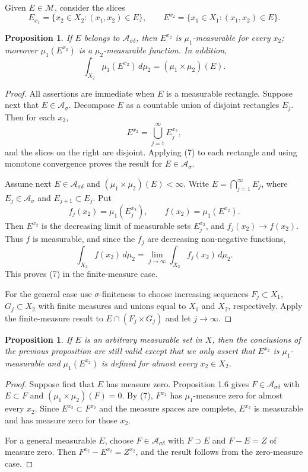 \documentclass[11pt,openany]{book}
\newtheorem{proposition}[theorem]{Proposition}
\begin{document}
Given $E\in\mathcal M$, consider the slices
\[
E_{x_1}=\{x_2\in X_2:(x_1,x_2)\in E\},
\qquad
E^{x_2}=\{x_1\in X_1:(x_1,x_2)\in E\}.
\]

\begin{proposition}
If $E$ belongs to $\mathcal A_{\sigma\delta}$, then $E^{x_2}$ is $\mu_1$-measurable for every $x_2$; moreover $\mu_1(E^{x_2})$ is a $\mu_2$-measurable function. In addition,
\begin{equation}
\int_{X_2}\mu_1(E^{x_2})\,d\mu_2=(\mu_1\times\mu_2)(E).
\tag{7}
\end{equation}
\end{proposition}

\begin{proof}
All assertions are immediate when $E$ is a measurable rectangle. Suppose next that $E\in\mathcal A_\sigma$. Decompose $E$ as a countable union of disjoint rectangles $E_j$. Then for each $x_2$,
\[
E^{x_2}=\bigcup_{j=1}^{\infty}E_j^{x_2},
\]
and the slices on the right are disjoint. Applying (7) to each rectangle and using monotone convergence proves the result for $E\in\mathcal A_\sigma$.

Assume next $E\in\mathcal A_{\sigma\delta}$ and $(\mu_1\times\mu_2)(E)<\infty$. Write $E=\bigcap_{j=1}^{\infty}E_j$, where $E_j\in\mathcal A_\sigma$ and $E_{j+1}\subset E_j$. Put
\[
f_j(x_2)=\mu_1(E_j^{x_2}),
\qquad
f(x_2)=\mu_1(E^{x_2}).
\]
Then $E^{x_2}$ is the decreasing limit of measurable sets $E_j^{x_2}$, and $f_j(x_2)\to f(x_2)$. Thus $f$ is measurable, and since the $f_j$ are decreasing non-negative functions,
\[
\int_{X_2}f(x_2)\,d\mu_2
=\lim_{j\to\infty}\int_{X_2}f_j(x_2)\,d\mu_2.
\]
This proves (7) in the finite-measure case.

For the general case use $\sigma$-finiteness to choose increasing sequences $F_j\subset X_1$, $G_j\subset X_2$ with finite measures and unions equal to $X_1$ and $X_2$, respectively. Apply the finite-measure result to $E\cap(F_j\times G_j)$ and let $j\to\infty$.
\end{proof}

\begin{proposition}
If $E$ is an arbitrary measurable set in $X$, then the conclusions of the previous proposition are still valid except that we only assert that $E^{x_2}$ is $\mu_1$-measurable and $\mu_1(E^{x_2})$ is defined for almost every $x_2\in X_2$.
\end{proposition}

\begin{proof}
Suppose first that $E$ has measure zero. Proposition 1.6 gives $F\in\mathcal A_{\sigma\delta}$ with $E\subset F$ and $(\mu_1\times\mu_2)(F)=0$. By (7), $F^{x_2}$ has $\mu_1$-measure zero for almost every $x_2$. Since $E^{x_2}\subset F^{x_2}$ and the measure spaces are complete, $E^{x_2}$ is measurable and has measure zero for those $x_2$.

For a general measurable $E$, choose $F\in\mathcal A_{\sigma\delta}$ with $F\supset E$ and $F-E=Z$ of measure zero. Then $F^{x_2}-E^{x_2}=Z^{x_2}$, and the result follows from the zero-measure case.
\end{proof}
\end{document}
